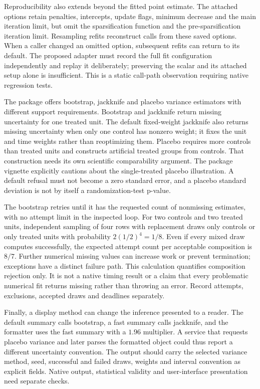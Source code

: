 Reproducibility also extends beyond the fitted point estimate. The attached
options retain penalties, intercepts, update flags, minimum decrease and the
main iteration limit, but omit the sparsification function and the
pre-sparsification iteration limit. Resampling refits reconstruct calls from
these saved options. When a caller changed an omitted option, subsequent
refits can return to its default. The proposed adapter must record the full
fit configuration independently and replay it deliberately; preserving the
scalar and its attached setup alone is insufficient. This is a static
call-path observation requiring native regression tests.
\citep{exec23_synthdid_reuse_source}

The package offers bootstrap, jackknife and placebo variance estimators with
different support requirements. Bootstrap and jackknife return missing
uncertainty for one treated unit. The default fixed-weight jackknife also
returns missing uncertainty when only one control has nonzero weight; it
fixes the unit and time weights rather than reoptimizing them. Placebo
requires more controls than treated units and constructs artificial treated
groups from controls. That construction needs its own scientific
comparability argument. The package vignette explicitly cautions about the
single-treated placebo illustration. A default refusal must not become a
zero standard error, and a placebo standard deviation is not by itself a
randomization-test p-value. \citep{exec23_synthdid_reuse_source}

The bootstrap retries until it has the requested count of nonmissing
estimates, with no attempt limit in the inspected loop. For two controls and
two treated units, independent sampling of four rows with replacement draws
only controls or only treated units with probability
$2(1/2)^4=1/8$. Even if every mixed draw computes successfully, the expected
attempt count per acceptable composition is $8/7$. Further numerical missing
values can increase work or prevent termination; exceptions have a distinct
failure path. This calculation quantifies composition rejection only. It is
not a native timing result or a claim that every problematic numerical fit
returns missing rather than throwing an error. Record attempts, exclusions,
accepted draws and deadlines separately.
\citep{exec23_synthdid_reuse_source,exec23_synthdid_reference}

Finally, a display method can change the inference presented to a reader.
The default summary calls bootstrap, a fast summary calls jackknife, and
the formatter uses the fast summary with a $1.96$ multiplier. A service that
requests placebo variance and later parses the formatted object could thus
report a different uncertainty convention. The output should carry the
selected variance method, seed, successful and failed draws, weights and
interval convention as explicit fields. Native output, statistical validity
and user-interface presentation need separate checks.
\citep{exec23_synthdid_reuse_source}


